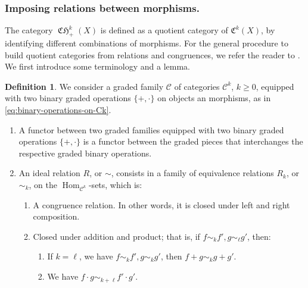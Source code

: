 \documentclass[JEP,XML,SOM,Unicode,published]{cedram}
\theoremstyle{plain}
\theoremstyle{definition}
\newtheorem{definition}[theorem]{Definition}
\newcommand{\Ccal}{\mathcal C}
\newcommand{\Cfrak}{\mathfrak C}
\DeclareMathOperator{\CHfrak}{\mathfrak{CH}}
\DeclareMathOperator{\Hom}{Hom}
\begin{document}
\subsubsection*{ Imposing relations between morphisms.} The category $\CHfrak_+^k(X)$ is defined as a quotient category of $\Cfrak^{k}(X)$, by identifying different combinations of morphisms. For the general procedure to build quotient categories from relations and congruences, we refer the reader to \cite[Chap.\,II, Section 8, Proposition 1]{MacLane-cat}. We first introduce some terminology and a lemma.

\begin{definition}\label{def:ideal-relation}
We consider a graded family $\Ccal$ of categories $\Ccal^{k}$, $k\geq 0$, equipped with two binary graded operations $\{+, \cdot \}$ on objects an morphisms, as in \eqref{eq:binary-operations-on-Ck}.

\begin{enumerate}
\item A functor between two graded families equipped with two binary graded operations $\{+, \cdot\}$ is a functor between the graded pieces that interchanges the respective graded binary operations.

\item An ideal relation $R$, or $\sim$, consists in a family of equivalence relations $R_k$, or~$\sim_k$, on the $\Hom_{\Ccal^k}$-sets, which is:
\begin{enumerate}
\item\label{item:ideal-relation-1} A congruence relation. In other words, it is closed under left and right composition.
\item\label{item:ideal-relation-2} Closed under addition and product; that is, if $f \sim_k f', g \sim_\ell g'$, then:
\begin{enumerate}
\item If $k = \ell$, we have $f \sim_k f', g \sim_k g'$, then $f + g \sim_{k} g + g'$.
\item We have $f \cdot g \sim_{k+\ell} f' \cdot g'$.
\end{enumerate}
\end{enumerate}
\end{enumerate}
\end{definition}
\end{document}
